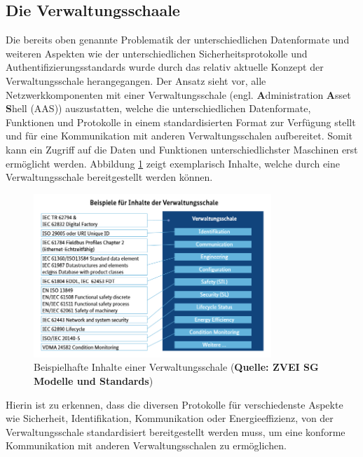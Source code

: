 \documentclass[
	12pt,								%
	DIV10,
	a4paper,         		%
	oneside,						%
	parskip=half,				%
	headings=normal,			%
	listof=totoc,					%
	bibliography=totoc,						%
	index=totoc,						%
	final								%
]{scrartcl}
\begin{document}
\subsection{Die Verwaltungsschaale}

Die bereits oben genannte Problematik der unterschiedlichen Datenformate und weiteren Aspekten wie der unterschiedlichen Sicherheitsprotokolle und Authentifizierungsstandards wurde durch das relativ aktuelle Konzept der Verwaltungsschale herangegangen. Der Ansatz sieht vor, alle Netzwerkkomponenten mit einer Verwaltungsschale (engl. \textbf{A}dministration \textbf{A}sset \textbf{S}hell (AAS)) auszustatten, welche die unterschiedlichen Datenformate, Funktionen und Protokolle in einem standardisierten Format zur Verfügung stellt und für eine Kommunikation mit anderen Verwaltungsschalen aufbereitet. Somit kann ein Zugriff auf die Daten und Funktionen unterschiedlichster Maschinen erst ermöglicht werden.
Abbildung \ref{func} zeigt exemplarisch Inhalte, welche durch eine Verwaltungsschale bereitgestellt werden können.
\begin{figure}[H]
\centering
\includegraphics[width=0.8\textwidth]{protos}
\caption{Beispielhafte Inhalte einer Verwaltungsschale (\textbf{Quelle: ZVEI SG Modelle und Standards})}
\label{func}
\end{figure}
Hierin ist zu erkennen, dass die diversen Protokolle für verschiedenste Aspekte wie Sicherheit, Identifikation, Kommunikation oder Energieeffizienz, von der Verwaltungsschale standardisiert bereitgestellt werden muss, um eine konforme Kommunikation mit anderen Verwaltungsschalen zu ermöglichen. 
\end{document}
